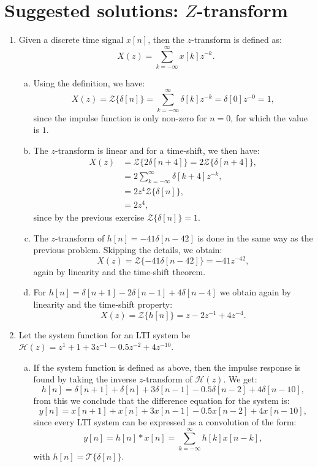 \newpage
\section{Suggested solutions: $Z$-transform}

\begin{enumerate}
\item Given a discrete time signal $x[n]$, then the $z$-transform is defined as:
$$X(z)=\sum_{k=-\infty}^{\infty}x[k]z^{-k}.$$

\begin{enumerate}[a)]

\item Using the definition, we have:
$$X(z)=\mathcal{Z}\{\delta[n]\}=\sum_{k=-\infty}^{\infty}\delta[k]z^{-k}=\delta[0]z^{-0}=1,$$
since the impulse function is only non-zero for $n=0$, for which the value is $1$. 

\item The $z$-transform is linear and for a time-shift, we then have:
\begin{align*}
    X(z)&=\mathcal{Z}\{2\delta[n+4]\}=2\mathcal{Z}\{\delta[n+4]\}, \\
    &=2\sum_{k=-\infty}^{\infty}\delta[k+4]z^{-k}, \\
    &=2z^{4}\mathcal{Z}\{\delta[n]\}, \\
    &=2z^{4},
\end{align*}
since by the previous exercise $\mathcal{Z}\{\delta[n]\}=1$.

\item The $z$-transform of $h[n]=-41\delta[n-42]$ is done in the same way as the previous problem. Skipping the details, we obtain:
$$X(z)=\mathcal{Z}\{-41\delta[n-42]\}=-41z^{-42},$$
again by linearity and the time-shift theorem.

\item For $h[n]=\delta[n+1]-2\delta[n-1]+4\delta[n-4]$ we obtain again by linearity and the time-shift property:
$$X(z)=\mathcal{Z}\{h[n]\}=z-2z^{-1}+4z^{-4}.$$
\end{enumerate}

\item Let the system function for an LTI system be $\mathcal{H}(z)=z^{1}+1+3z^{-1}-0.5z^{-2}+4z^{-10}$.

\begin{enumerate}[a)]

\item If the system function is defined as above, then the impulse response is found by taking the inverse $z$-transform of $\mathcal{H}(z)$. We get:
$$h[n]=\delta[n+1]+\delta[n]+3\delta[n-1]-0.5\delta[n-2]+4\delta[n-10],$$
from this we conclude that the difference equation for the system is:
$$y[n]=x[n+1]+x[n]+3x[n-1]-0.5x[n-2]+4x[n-10],$$
since every LTI system can be expressed as a convolution of the form:
$$y[n]=h[n]*x[n]=\sum_{k=-\infty}^{\infty}h[k]x[n-k],$$
with $h[n]=\mathcal{T}\{\delta[n]\}$. 


\end{enumerate}
\end{enumerate}
